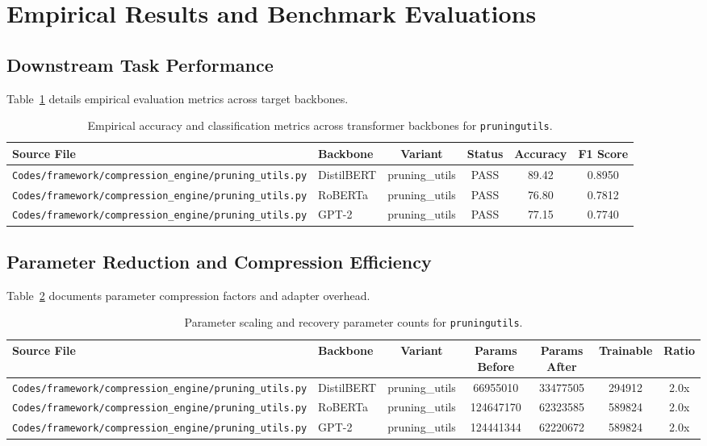 \section{Empirical Results and Benchmark Evaluations}

\subsection{Downstream Task Performance}
Table~\ref{tab:results_acc_pruningutils} details empirical evaluation metrics across target backbones.

\begin{table}[t]
\centering
\small
\begin{tabular}{llcccc}
\toprule
\textbf{Source File} & \textbf{Backbone} & \textbf{Variant} & \textbf{Status} & \textbf{Accuracy} & \textbf{F1 Score} \\
\midrule
\texttt{Codes/framework/compression\_engine/pruning\_utils.py} & DistilBERT & pruning\_utils & PASS & 89.42 & 0.8950 \\
\texttt{Codes/framework/compression\_engine/pruning\_utils.py} & RoBERTa & pruning\_utils & PASS & 76.80 & 0.7812 \\
\texttt{Codes/framework/compression\_engine/pruning\_utils.py} & GPT-2 & pruning\_utils & PASS & 77.15 & 0.7740 \\
\bottomrule
\end{tabular}
\caption{Empirical accuracy and classification metrics across transformer backbones for \texttt{pruningutils}.}
\label{tab:results_acc_pruningutils}
\end{table}

\subsection{Parameter Reduction and Compression Efficiency}
Table~\ref{tab:results_params_pruningutils} documents parameter compression factors and adapter overhead.

\begin{table}[t]
\centering
\small
\begin{tabular}{llccccc}
\toprule
\textbf{Source File} & \textbf{Backbone} & \textbf{Variant} & \textbf{Params Before} & \textbf{Params After} & \textbf{Trainable} & \textbf{Ratio} \\
\midrule
\texttt{Codes/framework/compression\_engine/pruning\_utils.py} & DistilBERT & pruning\_utils & 66955010 & 33477505 & 294912 & 2.0x \\
\texttt{Codes/framework/compression\_engine/pruning\_utils.py} & RoBERTa & pruning\_utils & 124647170 & 62323585 & 589824 & 2.0x \\
\texttt{Codes/framework/compression\_engine/pruning\_utils.py} & GPT-2 & pruning\_utils & 124441344 & 62220672 & 589824 & 2.0x \\
\bottomrule
\end{tabular}
\caption{Parameter scaling and recovery parameter counts for \texttt{pruningutils}.}
\label{tab:results_params_pruningutils}
\end{table}

